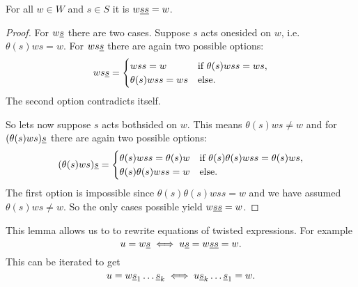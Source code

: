 \begin{lemm}
	For all $w \in W$ and $s \in S$ it is $w \underline{ss} = w$.

	\begin{proof}
		For $w \underline{s}$ there are two cases. Suppose $s$ acts onesided on $w$, i.e. $\theta(s)ws = w$. For $ws \underline{s}$ there are again two possible options:
		$$ ws \underline{s} = \begin{cases}
			wss = w & \textrm{if } \theta(s)wss = ws, \\
			\theta(s)wss = ws & \textrm{else}. \\
		\end{cases} $$
		The second option contradicts itself.

		So lets now suppose $s$ acts bothsided on $w$. This means $\theta(s)ws \neq w$ and for $(\theta(s)ws) \underline{s}$ there are again two possible options:
		$$ (\theta(s)ws) \underline{s} = \begin{cases}
			\theta(s)wss = \theta(s)w & \textrm{if } \theta(s) \theta(s) w ss = \theta(s) w s, \\
			\theta(s)\theta(s)wss = w & \textrm{else}. \\
		\end{cases} $$
		The first option is impossible since $\theta(s) \theta(s) w ss = w$ and we have assumed $\theta(s)ws \neq w$. So the only cases possible yield $w \underline{s} \underline{s} = w$.
	\end{proof}
\end{lemm}

\begin{rema}
	This lemma allows us to to rewrite equations of twisted expressions. For example
	$$ u = w \underline{s} \iff u \underline{s} = w \underline{s} \underline{s} = w. $$
	This can be iterated to get
	$$ u = w \underline{s}_1 \ldots \underline{s}_k \iff u \underline{s}_k \ldots \underline{s}_1 = w. $$
\end{rema}

